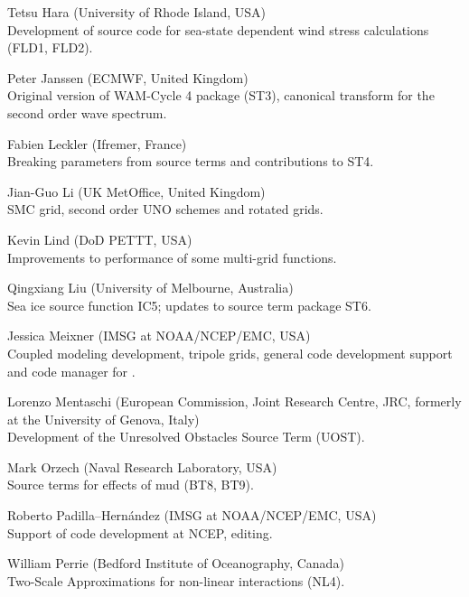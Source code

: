 \begin{list}{\ldots}{ }
\item [Tetsu Hara] (University of Rhode Island, USA) \\
  Development of source code for sea-state dependent wind stress calculations (FLD1, FLD2).

\item [Peter Janssen] (ECMWF, United Kingdom) \\
  Original version of WAM-Cycle 4 package (ST3), canonical transform for the second order wave spectrum.

\item [Fabien Leckler] (Ifremer, France) \\
  Breaking parameters from source terms and contributions to ST4.

\item [Jian-Guo Li] (UK MetOffice, United Kingdom) \\
  SMC grid, second order UNO schemes and rotated grids.

\item [Kevin Lind]  (DoD PETTT, USA)\\ 
  Improvements to performance of some multi-grid functions.
 
\item [Qingxiang Liu] (University of Melbourne, Australia)\\
  Sea ice source function IC5; updates to source term package ST6.

\item [Jessica Meixner] (IMSG at NOAA/NCEP/EMC, USA) \\
  Coupled modeling development, tripole grids, general code development support  and code manager for \ws.
 
\item [Lorenzo Mentaschi]  (European Commission, Joint Research Centre, JRC,
  formerly at the University of Genova, Italy)\\ 
  Development of the Unresolved Obstacles Source Term (UOST).
 
\item [Mark Orzech]  (Naval Research Laboratory, USA)\\ 
  Source terms for effects of mud (BT8, BT9).

\item [Roberto Padilla--Hern\'andez]  (IMSG at NOAA/NCEP/EMC, USA)\\ 
  Support of code development at NCEP, editing.

\item [William Perrie] (Bedford Institute of Oceanography, Canada)\\
 Two-Scale Approximations for non-linear interactions (NL4).


\end{list}
